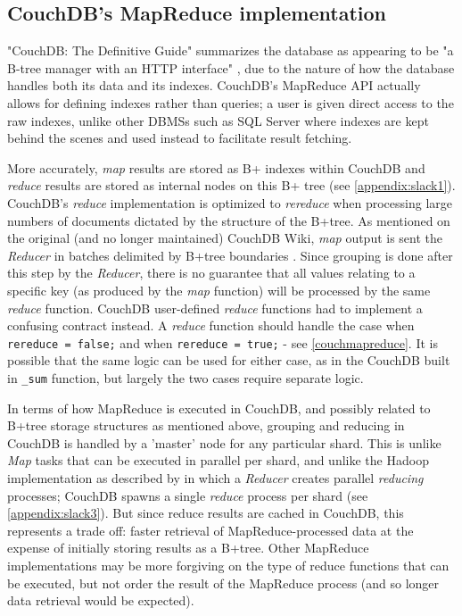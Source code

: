 \subsection{CouchDB's MapReduce implementation}
"CouchDB: The Definitive Guide" summarizes the database as appearing to be "a B-tree manager with an HTTP interface" \cite{couchguide}, due to the nature of how the database handles both its data and its indexes. CouchDB's MapReduce API actually allows for defining indexes rather than queries; a user is given direct access to the raw indexes, unlike other DBMSs such as SQL Server where indexes are kept behind the scenes and used instead to facilitate result fetching.

More accurately, \textit{map} results are stored as B+ indexes within CouchDB and \textit{reduce} results are stored as internal nodes on this B+ tree (see \ref{appendix:slack1}). CouchDB's \textit{reduce} implementation is optimized to \textit{rereduce} when processing large numbers of documents dictated by the structure of the B+tree. As mentioned on the original (and no longer maintained) CouchDB Wiki, \textit{map} output is sent the \textit{Reducer} in batches delimited by B+tree boundaries \cite{couchwiki}. Since grouping is done after this step by the \textit{Reducer}, there is no guarantee that all values relating to a specific key (as produced by the \textit{map} function) will be processed by the same \textit{reduce} function. CouchDB user-defined \textit{reduce} functions had to implement a confusing contract instead. A \textit{reduce} function should handle the case when \texttt{rereduce = false;} and when \texttt{rereduce = true;} - see \ref{couchmapreduce}. It is possible that the same logic can be used for either case, as in the CouchDB built in \texttt{_sum} function, but largely the two cases require separate logic.

In terms of how MapReduce is executed in CouchDB, and possibly related to B+tree storage structures as mentioned above, grouping and reducing in CouchDB is handled by a 'master' node for any particular shard. This is unlike \textit{Map} tasks that can be executed in parallel per shard, and unlike the Hadoop implementation as described by \cite{chandar2010} in which a \textit{Reducer} creates parallel \textit{reducing} processes; CouchDB spawns a single \textit{reduce} process per shard (see \ref{appendix:slack3}). But since reduce results are cached in CouchDB, this represents a trade off: faster retrieval of MapReduce-processed data at the expense of initially storing results as a B+tree. Other MapReduce implementations may be more forgiving on the type of reduce functions that can be executed, but not order the result of the MapReduce process (and so longer data retrieval would be expected).

